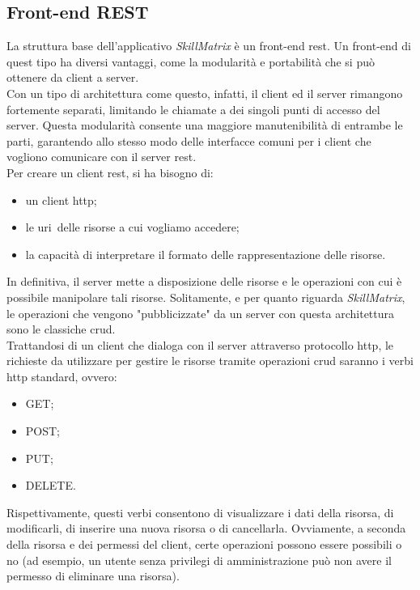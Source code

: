 \subsection{Front-end REST}
La struttura base dell'applicativo \emph{SkillMatrix} è un \gls{front-end} \gls{rest}. Un \gls{front-end} di quest tipo ha diversi vantaggi, come la modularità e portabilità che si può ottenere da client a server.\\
Con un tipo di architettura come questo, infatti, il client ed il server rimangono fortemente separati, limitando le chiamate a dei singoli punti di accesso del server. Questa modularità consente una maggiore manutenibilità di entrambe le parti, garantendo allo stesso modo delle interfacce comuni per i client che vogliono comunicare con il server \gls{rest}.\\
Per creare un client \gls{rest}, si ha bisogno di:
\begin{itemize}
	\item un client \gls{http};
	\item le \gls{uri}\glsfirstoccur\  delle risorse a cui vogliamo accedere;
	\item la capacità di interpretare il formato delle rappresentazione delle risorse.
\end{itemize}
In definitiva, il server mette a disposizione delle risorse e le operazioni con cui è possibile manipolare tali risorse. Solitamente, e per quanto riguarda \emph{SkillMatrix}, le operazioni che vengono "pubblicizzate" da un server con questa architettura sono le classiche \gls{crud}.\\
Trattandosi di un client che dialoga con il server attraverso protocollo \gls{http}, le richieste da utilizzare per gestire le risorse tramite operazioni \gls{crud} saranno i verbi \gls{http} standard, ovvero:
\begin{itemize}
	\item GET;
	\item POST;
	\item PUT;
	\item DELETE.
\end{itemize}
Rispettivamente, questi verbi consentono di visualizzare i dati della risorsa, di modificarli, di inserire una nuova risorsa o di cancellarla. Ovviamente, a seconda della risorsa e dei permessi del client, certe operazioni possono essere possibili o no (ad esempio, un utente senza privilegi di amministrazione può non avere il permesso di eliminare una risorsa).\\
